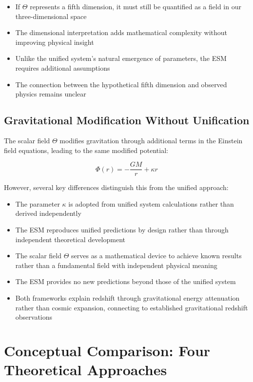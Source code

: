 \documentclass[12pt,a4paper]{article}
\begin{document}
	\begin{itemize}
		\item If $\Theta$ represents a fifth dimension, it must still be quantified as a field in our three-dimensional space
		\item The dimensional interpretation adds mathematical complexity without improving physical insight
		\item Unlike the unified system's natural emergence of parameters, the ESM requires additional assumptions
		\item The connection between the hypothetical fifth dimension and observed physics remains unclear
	\end{itemize}
	
	\subsection{Gravitational Modification Without Unification}
	\label{subsec:gravitational_modification_esm}
	
	The scalar field $\Theta$ modifies gravitation through additional terms in the Einstein field equations, leading to the same modified potential:
	
	\begin{equation}
		\Phi(r) = -\frac{GM}{r} + \kappa r
	\end{equation}
	
	However, several key differences distinguish this from the unified approach:
	
	\begin{itemize}
		\item The parameter $\kappa$ is adopted from unified system calculations rather than derived independently
		\item The ESM reproduces unified predictions by design rather than through independent theoretical development
		\item The scalar field $\Theta$ serves as a mathematical device to achieve known results rather than a fundamental field with independent physical meaning
		\item The ESM provides no new predictions beyond those of the unified system
		\item Both frameworks explain redshift through gravitational energy attenuation rather than cosmic expansion, connecting to established gravitational redshift observations \cite{Adams1925,Shapiro1971}
	\end{itemize}
	
	\section{Conceptual Comparison: Four Theoretical Approaches}
	\label{sec:four_framework_comparison}
	
\end{document}
